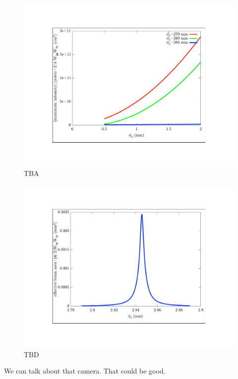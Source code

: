 \begin{figure}
    \centerline{\includegraphics{waists1}}
    \caption[]{\label{fig:typicaldata}
    TBA}
\end{figure}

\begin{figure}
    \centerline{\includegraphics{waists2}}
    \caption[]{\label{fig:typicaldata}
    TBD}
\end{figure}




We can talk about that camera. That could be good. %
